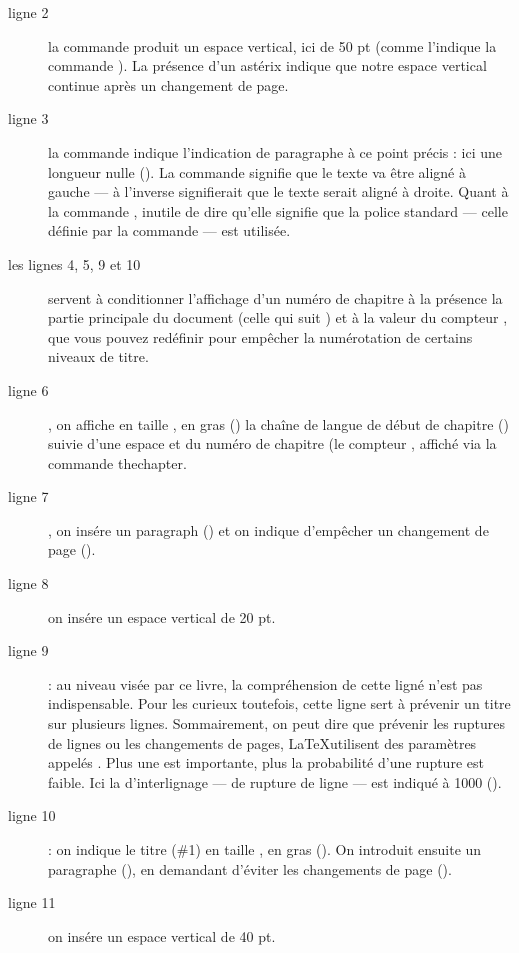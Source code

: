 \begin{description}
\item[ligne 2]la commande   produit un espace vertical, ici de 50 pt (comme l'indique la commande ). La présence d'un astérix indique que notre espace vertical continue après un changement de page.
\item[ligne 3]la commande  indique l'indication de paragraphe à ce point précis : ici une longueur nulle (). La commande  signifie que le texte va être aligné à gauche --- à l'inverse  signifierait que le texte serait aligné à droite. Quant à la commande , inutile de dire qu'elle signifie que la police standard --- celle définie par la commande  --- est utilisée.
\item[les lignes 4, 5, 9 et 10] servent à conditionner l'affichage d'un numéro de chapitre à la présence la partie principale du document (celle qui suit ) et à la valeur du compteur , que vous pouvez redéfinir pour empêcher la numérotation de certains niveaux de titre.
\item[ligne 6], on affiche en taille , en gras () la chaîne de langue de début de chapitre () suivie d'une espace et du numéro de chapitre (le compteur , affiché via la commande {thechapter}.
\item[ligne 7], on insére un paragraph () et on indique d'empêcher un changement de page ().
\item[ligne 8]on insére un espace vertical de 20 pt.
\item[ligne 9]: au niveau visée par ce livre, la compréhension de cette ligné n'est pas indispensable. Pour les curieux toutefois, cette ligne sert à prévenir un titre sur plusieurs lignes. Sommairement, on peut dire que prévenir les ruptures de lignes ou les changements de pages, \LaTeX utilisent des paramètres appelés . Plus une  est importante, plus la probabilité d'une rupture est faible. Ici la  d'interlignage --- de rupture de ligne --- est indiqué à 1000 (). 
\item[ligne 10]: on indique le titre (\#1) en taille , en gras (). On introduit ensuite un paragraphe (), en demandant d'éviter les changements de page ().
\item[ligne 11]on insére un espace vertical de 40 pt.
\end{description}

